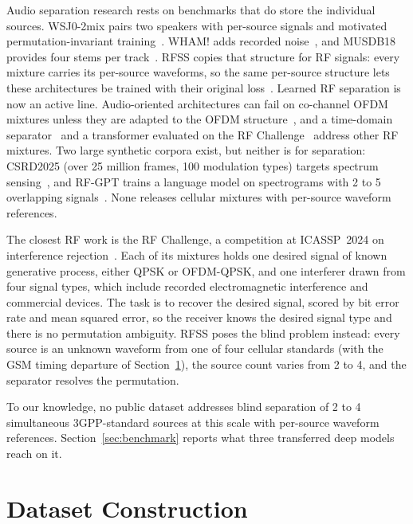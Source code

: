 \documentclass[journal]{IEEEtran}
\begin{document}
Audio separation research rests on benchmarks that do store the individual
sources. WSJ0-2mix pairs two speakers with per-source signals and motivated
permutation-invariant training~\cite{hershey2016deep,kolbaek2017multitalker}.
WHAM! adds recorded noise~\cite{wichern2019wham}, and MUSDB18 provides four
stems per track~\cite{rafii2017musdb18}. RFSS copies that structure for RF
signals: every mixture carries its per-source waveforms, so the same per-source
structure lets these architectures be trained with their original
loss~\cite{luo2019conv,luo2020dual}. Learned RF separation is now an active
line. Audio-oriented architectures can fail on co-channel OFDM mixtures unless
they are adapted to the OFDM structure~\cite{lee2023neural}, and a
time-domain separator~\cite{hinderer2025radar} and a transformer evaluated on
the RF Challenge~\cite{lifar2026rf} address other RF mixtures. Two large
synthetic corpora exist, but neither is for separation: CSRD2025 (over 25
million frames, 100 modulation types) targets spectrum
sensing~\cite{chang2025csrd}, and RF-GPT trains a language model on
spectrograms with 2 to 5 overlapping signals~\cite{zou2026rfgpt}. None
releases cellular mixtures with per-source waveform references.

The closest RF work is the RF Challenge, a competition at ICASSP~2024 on
interference rejection~\cite{lancho2024rfchallenge}. Each of its mixtures holds
one desired signal of known generative process, either QPSK or OFDM-QPSK, and
one interferer drawn from four signal types, which include recorded
electromagnetic interference and commercial devices. The task is to recover
the desired signal, scored by bit error rate and mean squared error, so the
receiver knows the desired signal type and there is no permutation ambiguity.
RFSS poses the blind
problem instead: every source is an unknown waveform from one of four cellular
standards (with the GSM timing departure of Section~\ref{sec:construction}), the
source count varies from 2 to 4, and the separator resolves the permutation.

To our knowledge, no public dataset addresses blind separation of 2 to 4
simultaneous 3GPP-standard sources at this scale with per-source waveform
references. Section~\ref{sec:benchmark} reports what three transferred deep models
reach on it.

\section{Dataset Construction}
\label{sec:construction}
\end{document}
